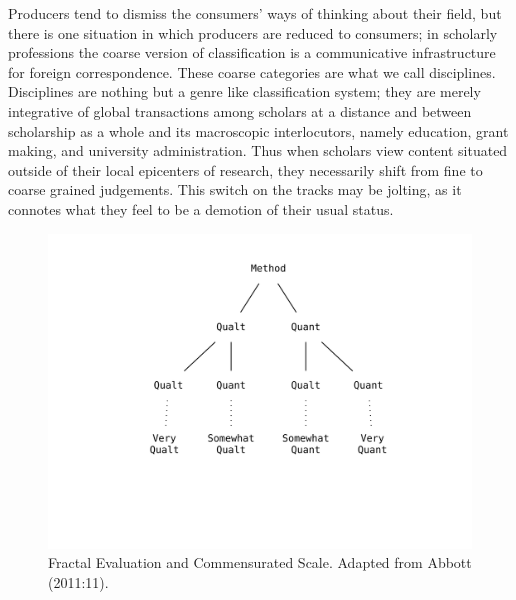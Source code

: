 \documentclass[]{book}
\theoremstyle{definition}
\theoremstyle{definition}
\theoremstyle{definition}
\theoremstyle{remark}
\begin{document}
Producers tend to dismiss the consumers' ways of thinking about their
field, but there is one situation in which producers are reduced to
consumers; in scholarly professions the coarse version of classification
is a communicative infrastructure for foreign correspondence. These
coarse categories are what we call disciplines. Disciplines are nothing
but a genre like classification system; they are merely integrative of
global transactions among scholars at a distance and between scholarship
as a whole and its macroscopic interlocutors, namely education, grant
making, and university administration. Thus when scholars view content
situated outside of their local epicenters of research, they necessarily
shift from fine to coarse grained judgements. This switch on the tracks
may be jolting, as it connotes what they feel to be a demotion of their
usual status.

\begin{figure}

{\centering \includegraphics[width=6.35in]{img/fractal} 

}

\caption{Fractal Evaluation and Commensurated Scale. Adapted from Abbott (2011:11).}\label{fig:fractalp}
\end{figure}
\end{document}
